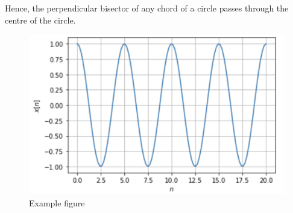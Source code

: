 \documentclass[journal,12pt,twocolumn]{IEEEtran}
\begin{document}
Hence, the perpendicular bisector of any chord of a circle passes through the centre of the circle.

\begin{figure}[h!]
    \includegraphics[width=\columnwidth]{figure.png}
    \caption{Example figure}
\end{figure}
\end{document}
